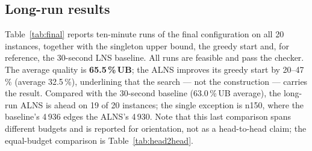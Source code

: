 \documentclass[10pt, a4paper]{article}
\newcommand{\ub}{\%\,UB}
\begin{document}
\subsection{Long-run results}
Table~\ref{tab:final} reports ten-minute runs of the final configuration on
all 20 instances, together with the singleton upper bound, the greedy start
and, for reference, the 30-second LNS baseline. All runs are feasible and
pass the checker. The average quality is \textbf{65.5\,\ub}; the ALNS
improves its greedy start by 20--47\,\% (average 32.5\,\%), underlining that
the search --- not the construction --- carries the result. Compared with
the 30-second baseline (63.0\,\ub{} average), the long-run ALNS is ahead on
19 of 20 instances; the single exception is n150, where the baseline's
4\,936 edges the ALNS's 4\,930. Note that this last comparison spans
different budgets and is reported for orientation, not as a head-to-head
claim; the equal-budget comparison is Table~\ref{tab:head2head}.
\end{document}
